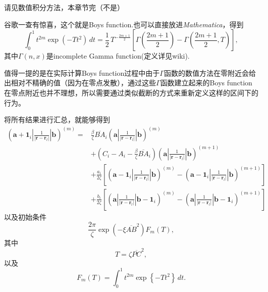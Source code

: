\documentclass[12pt,a4paper,openany,twoside]{book}
\numberwithin{equation}{section}
\begin{document}
          请见数值积分方法，本章节完（不是）

          谷歌一查有惊喜，这个就是Boys function.也可以直接放进\emph{Mathematica}，得到
          \begin{equation}
              \int _0^1 t^{2m} \exp(-Tt^2) \, dt = \frac{1}{2} \, T^{-\frac{2m+1}{2}}\left[\Gamma\left(\frac{2m+1}{2}\right) -  \Gamma\left(\frac{2m+1}{2},T\right)\right],
          \end{equation}
          其中$\Gamma(n,x)$是incomplete Gamma function(定义详见wiki).

          值得一提的是在实际计算Boys function过程中由于$\Gamma$函数的数值方法在零附近会给出相对不精确的值（因为在零点发散），通过这些$\Gamma$函数建立起来的Boys function在零点附近也并不理想，所以需要通过类似截断的方式来重新定义这样的区间下的行为。

          将所有结果进行汇总，就能够得到
          \begin{equation}
              \begin{aligned}
              (\boldsymbol{a} + \boldsymbol{1}_i|\frac{1}{|\boldsymbol{r}-\boldsymbol{r}_l|}|\boldsymbol{b})^{(m)} =  & \frac{\beta}{\zeta} \overline{BA}_i (\boldsymbol{a}|\frac{1}{|\boldsymbol{r}-\boldsymbol{r}_l|}|\boldsymbol{b})^{(m)} \\
              & + \left(C_i - A_i - \frac{\beta}{\zeta} \overline{BA}_i \right) (\boldsymbol{a}|\frac{1}{|\boldsymbol{r}-\boldsymbol{r}_l|}|\boldsymbol{b})^{(m+1)} \\
              & + \frac{a_i}{2\zeta}\left[(\boldsymbol{a} - \boldsymbol{1}_i|\frac{1}{|\boldsymbol{r}-\boldsymbol{r}_l|}|\boldsymbol{b})^{(m)}- (\boldsymbol{a} - \boldsymbol{1}_i|\frac{1}{|\boldsymbol{r}-\boldsymbol{r}_l|}|\boldsymbol{b})^{(m+1)}\right] \\
              & + \frac{b_i}{2\zeta}\left[(\boldsymbol{a}|\frac{1}{|\boldsymbol{r}-\boldsymbol{r}_l|}|\boldsymbol{b}- \boldsymbol{1}_i)^{(m)}- (\boldsymbol{a}|\frac{1}{|\boldsymbol{r}-\boldsymbol{r}_l|}|\boldsymbol{b} - \boldsymbol{1}_i)^{(m+1)}\right]
              \end{aligned}
          \end{equation}
          以及初始条件
          \begin{equation}
              \frac{2\pi}{\zeta} \exp\left(- \xi \overline{AB}^2\right) F_m(T),
          \end{equation}
          其中
          \begin{equation}
              T = \zeta \overline{PC}^2
          ,\end{equation}
          以及
          \begin{equation}
              F_m (T) = \int ^1_0 t^{2m} \exp \left\{ - T t^2 \right\}  \, dt 
          .\end{equation}
\end{document}
